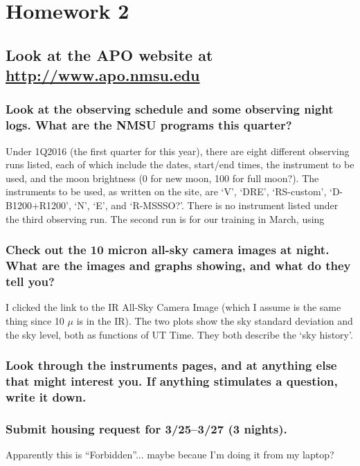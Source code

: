 \documentclass[12pt]{article}
\begin{document}
\section*{Homework 2}
\subsection*{Look at the APO website at
\textcolor{blue}{\url{http://www.apo.nmsu.edu}}}

\subsubsection*{Look at the observing schedule and some observing night logs.
    What are the NMSU programs this quarter?}

    Under 1Q2016 (the first quarter for this year), there are eight different
    observing runs listed, each of which include the dates, start/end times,
    the instrument to be used, and the moon brightness (0 for new moon,
    100 for full moon?).
    The instruments to be used, as written on the site, are
    `V', `DRE', `RS-custom', `D-B1200+R1200', `N', `E', and `R-MSSSO?'.
    There is no instrument listed under the third observing run.
    The second run is for our training in March, using


\subsubsection*{Check out the 10 micron all-sky camera images at night. What are
    the images and graphs showing, and what do they tell you?}

    I clicked the link to the IR All-Sky Camera Image (which I assume is the
    same thing since 10 $\mu$ is in the IR). The two plots show the sky
    standard deviation and the sky level, both as functions of UT Time.
    They both describe the `sky history'.


\subsubsection*{Look through the instruments pages, and at anything else that might
    interest you. If anything stimulates a question, write it down.}

\subsubsection*{Submit housing request for 3/25--3/27 (3 nights).}

    Apparently this is ``Forbidden''... maybe becaue I'm doing it from my
    laptop?
\end{document}
